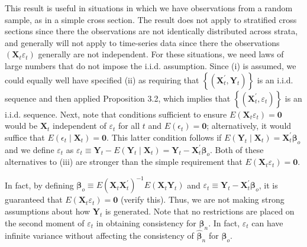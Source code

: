 \documentclass[10pt]{article}
\begin{document}
This result is useful in situations in which we have observations from a random sample, as in a simple cross section. The result does not apply to stratified cross sections since there the observations are not identically distributed across strata, and generally will not apply to time-series data since there the observations $\left(\mathbf{X}_{t} \varepsilon_{t}\right)$ generally are not independent. For these situations, we need laws of large numbers that do not impose the i.i.d. assumption. Since (i) is assumed, we could equally well have specified (ii) as requiring that $\left\{\left(\mathbf{X}_{t}^{\prime}, \mathbf{Y}_{t}\right)\right\}$ is an i.i.d. sequence and then applied Proposition 3.2, which implies that $\left\{\left(\mathbf{X}_{t}^{\prime}, \varepsilon_{t}\right)\right\}$ is an i.i.d. sequence. Next, note that conditions sufficient to ensure $E\left(\mathbf{X}_{t} \varepsilon_{t}\right)=\mathbf{0}$ would be $\mathbf{X}_{t}$ independent of $\varepsilon_{t}$ for all $t$ and $E\left(\epsilon_{t}\right)=\mathbf{0}$; alternatively, it would suffice that $E\left(\epsilon_{t} \mid \mathbf{X}_{t}\right)=\mathbf{0}$. This latter condition follows if $E\left(\mathbf{Y}_{t} \mid \mathbf{X}_{t}\right)=\mathbf{X}_{t}^{\prime} \boldsymbol{\beta}_{o}$ and we define $\varepsilon_{t}$ as $\varepsilon_{t} \equiv \mathbf{Y}_{t}-E\left(\mathbf{Y}_{t} \mid \mathbf{X}_{t}\right)=\mathbf{Y}_{t}-\mathbf{X}_{t}^{\prime} \boldsymbol{\beta}_{o}$. Both of these alternatives to (iii) are stronger than the simple requirement that $E\left(\mathbf{X}_{t} \varepsilon_{t}\right)=\mathbf{0}$.

In fact, by defining $\boldsymbol{\beta}_{o} \equiv E\left(\mathbf{X}_{t} \mathbf{X}_{t}^{\prime}\right)^{-1} E\left(\mathbf{X}_{t} \mathbf{Y}_{t}\right)$ and $\varepsilon_{t} \equiv \mathbf{Y}_{t}-\mathbf{X}_{t}^{\prime} \boldsymbol{\beta}_{o}$, it is guaranteed that $E\left(\mathbf{X}_{t} \varepsilon_{t}\right)=\mathbf{0}$ (verify this). Thus, we are not making strong assumptions about how $\mathbf{Y}_{t}$ is generated. Note that no restrictions are placed on the second moment of $\varepsilon_{t}$ in obtaining consistency for $\hat{\boldsymbol{\beta}}_{n}$. In fact, $\varepsilon_{t}$ can have infinite variance without affecting the consistency of $\hat{\boldsymbol{\beta}}_{n}$ for $\boldsymbol{\beta}_{o}$.
\end{document}
